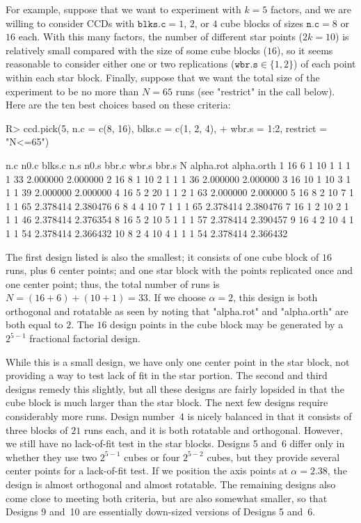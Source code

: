 \documentclass[article,nojss]{jss}
\begin{document}
For example, suppose that we want to experiment with $k=5$ factors, and we are willing to consider CCDs with $\mathtt{blks.c}=1$, $2$, or $4$ cube blocks of sizes $\mathtt{n.c}=8$ or $16$ each.  
With this many factors, the number of different star points ($2k=10$) is relatively small compared with the size of some cube blocks ($16$), so it seems reasonable to consider either one or two replications ($\mathtt{wbr.s}\in\{1,2\}$) of each point within each star block.  
Finally, suppose that we want the total size of the experiment to be no more than $N=65$ runs (see "restrict" in the call below).  Here are the ten best choices based on these criteria:
\begin{Schunk}
\begin{Sinput}
R> ccd.pick(5, n.c = c(8, 16), blks.c = c(1, 2, 4),
+   wbr.s = 1:2, restrict = "N<=65")
\end{Sinput}
\begin{Soutput}
   n.c n0.c blks.c n.s n0.s bbr.c wbr.s bbr.s  N alpha.rot alpha.orth
1   16    6      1  10    1     1     1     1 33  2.000000   2.000000
2   16    8      1  10    2     1     1     1 36  2.000000   2.000000
3   16   10      1  10    3     1     1     1 39  2.000000   2.000000
4   16    5      2  20    1     1     2     1 63  2.000000   2.000000
5   16    8      2  10    7     1     1     1 65  2.378414   2.380476
6    8    4      4  10    7     1     1     1 65  2.378414   2.380476
7   16    1      2  10    2     1     1     1 46  2.378414   2.376354
8   16    5      2  10    5     1     1     1 57  2.378414   2.390457
9   16    4      2  10    4     1     1     1 54  2.378414   2.366432
10   8    2      4  10    4     1     1     1 54  2.378414   2.366432
\end{Soutput}
\end{Schunk}
The first design listed is also the smallest; it consists of one cube block of $16$ runs, plus $6$ center points; and one star block with the points replicated once and one center point; thus, the total number of runs is $N=(16+6)+(10+1) = 33$.
If we choose $\alpha=2$, this design is both orthogonal and rotatable as seen by noting that "alpha.rot" and "alpha.orth" are both equal to $2$.  The $16$ design points in the cube block may be generated by a $2^{5-1}$ fractional factorial design.

While this is a small design, we have only one center point in the star block, not providing a way to test lack of fit in the star portion.  The second and third designs remedy this slightly, but all these designs are fairly lopsided in that the cube block is much larger than the star block.  The next few designs require considerably more runs.  Design number~4 is nicely balanced in that it consists of three blocks of $21$ runs each, and it is both rotatable and orthogonal.  However, we still have no lack-of-fit test in the star blocks.  Designs 5 and~6 differ only in whether they use two $2^{5-1}$ cubes or four $2^{5-2}$ cubes, but they provide several center points for a lack-of-fit test.  If we position the axis points at $\alpha=2.38$, the design is almost orthogonal and almost rotatable.  The remaining designs also come close to meeting both criteria, but are also somewhat smaller, so that Designs 9 and~10 are essentially down-sized versions of Designs 5 and~6.
\end{document}
